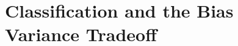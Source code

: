 \documentclass[12pt]{beamer}
\begin{document}





















\section{Classification and the Bias Variance Tradeoff}
\end{document}
